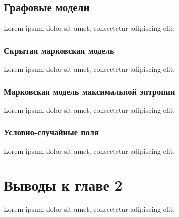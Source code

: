 \subsection{Графовые модели}
Lorem ipsum dolor sit amet, consectetur adipiscing elit.

\subsubsection{Скрытая марковская модель}
Lorem ipsum dolor sit amet, consectetur adipiscing elit.

\subsubsection{Марковская модель максимальной энтропии}
Lorem ipsum dolor sit amet, consectetur adipiscing elit.

\subsubsection{Условно-случайные поля}
Lorem ipsum dolor sit amet, consectetur adipiscing elit.

\section*{Выводы к главе 2}
Lorem ipsum dolor sit amet, consectetur adipiscing elit.
